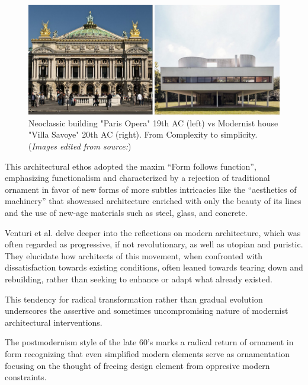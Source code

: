      \begin{figure}[htb]
          \centering
          \includegraphics[width= \linewidth]{Images/NeoclassicismVsModernism}
          \caption{Neoclassic building "Paris Opera" 19th AC (left) vs Modernist house "Villa Savoye" 20th AC (right). From Complexity to simplicity. (\textit{Images edited from source:\cite{Stacbond2020}})}
          \label{fig:NeoclassicalvsModernism}
        \end{figure}

This architectural ethos adopted the maxim ``Form follows function'', emphasizing functionalism and characterized by a rejection of traditional ornament in favor of new forms of more subtles intricacies like the “aesthetics of machinery” that showcased architecture  enriched  with  only  the  beauty of its lines and the use of new-age materials such as steel, glass, and concrete\cite{Gage2015}.


Venturi et al.\cite{Venturi1972} delve deeper into the reflections on modern architecture, which was often regarded as progressive, if not revolutionary, as well as utopian and puristic.
They elucidate how architects of this movement, when confronted with dissatisfaction towards existing conditions, often leaned towards tearing down and rebuilding, rather than seeking to enhance or adapt what already existed.

This tendency for radical transformation rather than gradual evolution underscores the assertive and sometimes uncompromising nature of modernist architectural interventions.


The postmodernism style of the late 60's marks a radical return of ornament in form recognizing that even simplified modern elements serve as ornamentation focusing on the thought of freeing design element from oppresive modern constraints.



